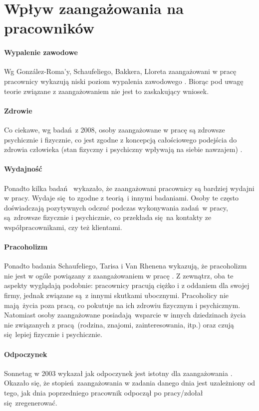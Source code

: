 \section{Wpływ zaangażowania na pracowników}
\label{sec:thoery-eng-infl2}
\paragraph{Wypalenie zawodowe}
Wg González-Roma'y, Schaufeliego, Bakkera, Lloreta zaangażowani w pracę pracownicy wykazują niski poziom wypalenia zawodowego \cite{gonzlez2006burnout}. Biorąc pod uwagę teorie związane z zaangażowaniem nie jest to zaskakujący wniosek.
\paragraph{Zdrowie}
Co ciekawe, wg badań z 2008, osoby zaangażowane w pracę są zdrowsze psychicznie i fizycznie, co jest zgodne z koncepcją całościowego podejścia do zdrowia człowieka (stan fizyczny i psychiczny wpływają na siebie nawzajem) \cite{schaufeli2008workaholism}.
\paragraph{Wydajność}
Ponadto kilka badań \cite{xanthopoulou2008working,xanthopoulou2009work} wykazało, że zaangażowani pracownicy są bardziej wydajni w pracy. Wydaje się to zgodne z teorią i innymi badaniami. Osoby te często doświadczają pozytywnych odczuć podczas wykonywania zadań w pracy, są zdrowsze fizycznie i psychicznie, co przekłada się na kontakty ze współpracownikami, czy też klientami.
\paragraph{Pracoholizm}
Ponadto badania Schaufeliego, Tarisa i Van Rhenena wykazują, że pracoholizm nie jest w ogóle powiązany z zaangażowaniem w pracę \cite{schaufeli2008workaholism}. Z zewnątrz, oba te aspekty wyglądają podobnie: pracownicy pracują ciężko i z oddaniem dla swojej firmy, jednak związane są z innymi skutkami ubocznymi. Pracoholicy nie mają życia poza pracą, co pokutuje na ich zdrowiu fizycznym i psychicznym. Natomiast osoby zaangażowane posiadają wsparcie w innych dziedzinach życia nie związanych z pracą (rodzina,
znajomi, zainteresowania, itp.) oraz czują się lepiej fizycznie i psychicznie.
\paragraph{Odpoczynek}
Sonnetag w 2003 wykazał jak odpoczynek jest istotny dla zaangażowania \cite{sonnentag2003recovery}. Okazało się, że stopień zaangażowania w zadania danego dnia jest uzależniony od tego, jak dnia poprzedniego pracownik odpoczął po pracy/zdołał się zregenerować.
